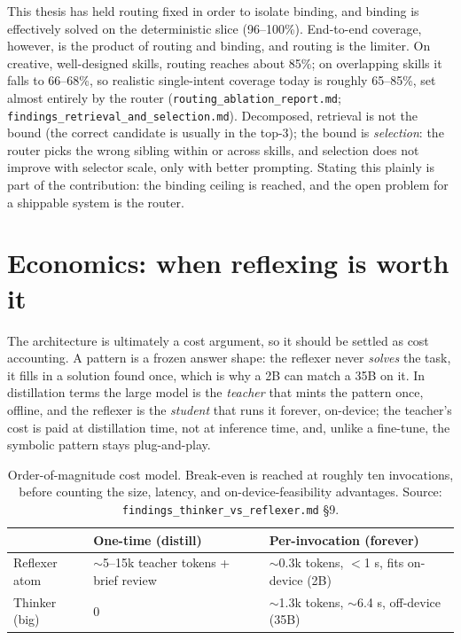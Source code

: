 This thesis has held routing fixed in order to isolate binding, and binding is
effectively solved on the deterministic slice (96--100\%). End-to-end coverage,
however, is the product of routing and binding, and routing is the limiter. On
creative, well-designed skills, routing reaches about 85\%; on overlapping skills
it falls to 66--68\%, so realistic single-intent coverage today is roughly
65--85\%, set almost entirely by the router
(\texttt{routing\_ablation\_report.md}; \texttt{findings\_retrieval\_and\_selection.md}).
Decomposed, retrieval is not the bound (the correct candidate is usually in the
top-3); the bound is \emph{selection}: the router picks the wrong sibling within
or across skills, and selection does not improve with selector scale, only with
better prompting. Stating this plainly is part of the contribution: the binding
ceiling is reached, and the open problem for a shippable system is the router.

\section{Economics: when reflexing is worth it}
\label{sec:economics}

The architecture is ultimately a cost argument, so it should be settled as cost
accounting. A pattern is a frozen answer shape: the reflexer never \emph{solves}
the task, it fills in a solution found once, which is why a 2B can match a 35B on
it. In distillation terms the large model is the \emph{teacher} that mints the
pattern once, offline, and the reflexer is the \emph{student} that runs it
forever, on-device; the teacher's cost is paid at distillation time, not at
inference time, and, unlike a fine-tune, the symbolic pattern stays
plug-and-play.

\begin{table}[t]
\centering
\caption{Order-of-magnitude cost model. Break-even is reached at roughly ten
invocations, before counting the size, latency, and on-device-feasibility
advantages. Source: \texttt{findings\_thinker\_vs\_reflexer.md} \S9.}
\label{tab:economics}
\begin{tabular}{lll}
\toprule
 & One-time (distill) & Per-invocation (forever) \\
\midrule
Reflexer atom & $\sim$5--15k teacher tokens + brief review & $\sim$0.3k tokens, $<$1 s, fits on-device (2B) \\
Thinker (big) & 0 & $\sim$1.3k tokens, $\sim$6.4 s, off-device (35B) \\
\bottomrule
\end{tabular}
\end{table}

